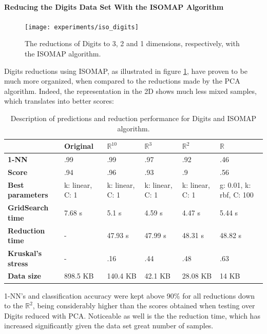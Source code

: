 \paragraph{Reducing the Digits Data Set With the ISOMAP Algorithm}

\begin{figure}[H]
	\centering
	\captionsetup{justification=centering}
	\texttt{[image: experiments/iso\_digits]}
	\caption{The reductions of Digits to 3, 2 and 1 dimensions, respectively, with the ISOMAP algorithm.}
	\label{fig:dsdigitsiso}
\end{figure}

Digits reductions using ISOMAP, as illustrated in figure \ref{fig:dsdigitsiso}, have proven to be much more organized, when compared to the reductions made by the PCA algorithm. Indeed, the representation in the 2D shows much less mixed samples, which translates into better scores:

\begin{table}[H]
	\centering
	
	\begin{tabular}{|p{.14\linewidth}|p{.14\linewidth}|p{.14\linewidth}|p{.14\linewidth}|p{.14\linewidth}|p{.14\linewidth}|}
		\hline
		& \textbf{Original} & $\mathbb{R}^{10}$ & $\mathbb{R}^3$ & $\mathbb{R}^2$ & $\mathbb{R}$ \\\hline
		\textbf{1-NN} & .99 & .99 & .97 & .92 & .46 \\\hline
		\textbf{Score} & .94 & .96 & .93 & .9 & .56 \\\hline
		\textbf{Best parameters} & k: linear, C: 1 & k: linear, C: 1 & k: linear, C: 1 & k: linear, C: 1 & g: 0.01, k: rbf, C: 100 \\\hline
		\textbf{GridSearch time} & 7.68 s & 5.1 s & 4.59 s & 4.47 s & 5.44 s \\\hline
		\textbf{Reduction time} & - & 47.93 s & 47.99 s & 48.31 s & 48.82 s \\\hline
		\textbf{Kruskal's stress} & - & .16 & .44 & .48 & .63 \\\hline
		\textbf{Data size} & 898.5 KB & 140.4 KB & 42.1 KB & 28.08 KB & 14 KB \\\hline
	\end{tabular}
	
	\caption{Description of predictions and reduction performance for Digits and ISOMAP algorithm.}
\end{table}

1-NN's and classification accuracy were kept above 90\% for all reductions down to the $\mathbb{R}^2$, being considerably higher than the scores obtained when testing over Digits reduced with PCA. Noticeable as well is the the reduction time, which has increased significantly given the data set great number of samples.

